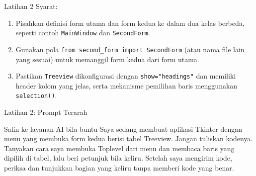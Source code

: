 \documentclass[aspectratio=169, table]{beamer}
\begin{document}
\begin{frame}[fragile,allowframebreaks=0.8]{Latihan 2}
Syarat:
\begin{enumerate}
    \item Pisahkan definisi form utama dan form kedua ke dalam dua kelas berbeda, seperti contoh \texttt{MainWindow} dan \texttt{SecondForm}.
    \item Gunakan pola \texttt{from second\_form import SecondForm} (atau nama file lain yang sesuai) untuk memanggil form kedua dari form utama.
    \item Pastikan \texttt{Treeview} dikonfigurasi dengan \texttt{show="headings"} dan memiliki header kolom yang jelas, serta mekanisme pemilihan baris menggunakan \texttt{selection()}.
\end{enumerate}
\end{frame}

\begin{frame}{Latihan 2: Prompt Terarah}
\begin{block}{Salin ke layanan AI bila buntu}
\small Saya sedang membuat aplikasi Tkinter dengan menu yang membuka form kedua berisi tabel Treeview. Jangan tuliskan kodenya. Tanyakan cara saya membuka Toplevel dari menu dan membaca baris yang dipilih di tabel, lalu beri petunjuk bila keliru. Setelah saya mengirim kode, periksa dan tunjukkan bagian yang keliru tanpa memberi kode yang benar.
\end{block}
\end{frame}
\end{document}
